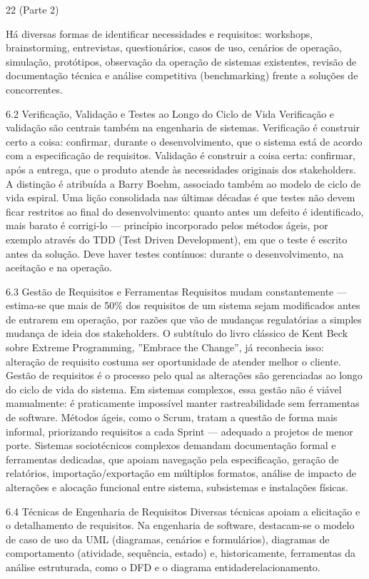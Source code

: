 22 (Parte 2)

Há diversas formas de identificar necessidades e requisitos: workshops, brainstorming, entrevistas, questionários, casos de uso, cenários de operação, simulação, protótipos, observação da operação de sistemas existentes, revisão de documentação técnica e análise competitiva (benchmarking) frente a soluções de concorrentes.

6.2 Verificação, Validação e Testes ao Longo do Ciclo de Vida Verificação e validação são centrais também na engenharia de sistemas. Verificação é construir certo a coisa: confirmar, durante o desenvolvimento, que o sistema está de acordo com a especificação de requisitos. Validação é construir a coisa certa: confirmar, após a entrega, que o produto atende às necessidades originais dos stakeholders. A distinção é atribuída a Barry Boehm, associado também ao modelo de ciclo de vida espiral. Uma lição consolidada nas últimas décadas é que testes não devem ficar restritos ao final do desenvolvimento: quanto antes um defeito é identificado, mais barato é corrigi-lo — princípio incorporado pelos métodos ágeis, por exemplo através do TDD (Test Driven Development), em que o teste é escrito antes da solução. Deve haver testes contínuos: durante o desenvolvimento, na aceitação e na operação.

6.3 Gestão de Requisitos e Ferramentas Requisitos mudam constantemente — estima-se que mais de 50\% dos requisitos de um sistema sejam modificados antes de entrarem em operação, por razões que vão de mudanças regulatórias a simples mudança de ideia dos stakeholders. O subtítulo do livro clássico de Kent Beck sobre Extreme Programming, ”Embrace the Change”, já reconhecia isso: alteração de requisito costuma ser oportunidade de atender melhor o cliente. Gestão de requisitos é o processo pelo qual as alterações são gerenciadas ao longo do ciclo de vida do sistema. Em sistemas complexos, essa gestão não é viável manualmente: é praticamente impossível manter rastreabilidade sem ferramentas de software. Métodos ágeis, como o Scrum, tratam a questão de forma mais informal, priorizando requisitos a cada Sprint — adequado a projetos de menor porte. Sistemas sociotécnicos complexos demandam documentação formal e ferramentas dedicadas, que apoiam navegação pela especificação, geração de relatórios, importação/exportação em múltiplos formatos, análise de impacto de alterações e alocação funcional entre sistema, subsistemas e instalações físicas.

6.4 Técnicas de Engenharia de Requisitos Diversas técnicas apoiam a elicitação e o detalhamento de requisitos. Na engenharia de software, destacam-se o modelo de caso de uso da UML (diagramas, cenários e formulários), diagramas de comportamento (atividade, sequência, estado) e, historicamente, ferramentas da análise estruturada, como o DFD e o diagrama entidaderelacionamento.

